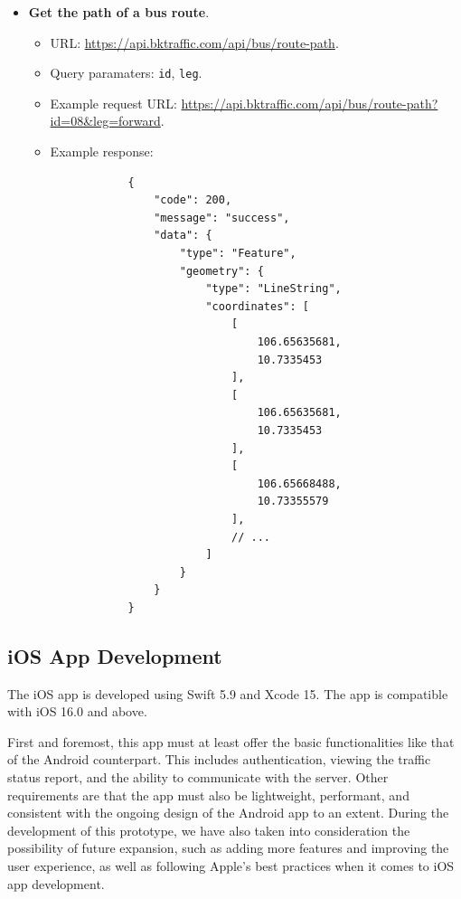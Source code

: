 \begin{itemize}
    \item \textbf{Get the path of a bus route}.
    \begin{itemize}
        \item URL: \url{https://api.bktraffic.com/api/bus/route-path}.
        \item Query paramaters: \lstinline{id}, \lstinline{leg}.
        \item Example request URL: \url{https://api.bktraffic.com/api/bus/route-path?id=08&leg=forward}.
        \item Example response:
        \begin{lstlisting}
            {
                "code": 200,
                "message": "success",
                "data": {
                    "type": "Feature",
                    "geometry": {
                        "type": "LineString",
                        "coordinates": [
                            [
                                106.65635681,
                                10.7335453
                            ],
                            [
                                106.65635681,
                                10.7335453
                            ],
                            [
                                106.65668488,
                                10.73355579
                            ],
                            // ...  
                        ]
                    }
                }
            }
        \end{lstlisting}
    \end{itemize} 
\end{itemize}


\subsection{iOS App Development}
The iOS app is developed using Swift 5.9 and Xcode 15. The app is compatible with iOS 16.0 and above.

First and foremost, this app must at least offer the basic functionalities like that of the Android counterpart. This includes authentication, viewing the traffic status report, and the ability to communicate with the server. Other requirements are that the app must also be lightweight, performant, and consistent with the ongoing design of the Android app to an extent. During the development of this prototype, we have also taken into consideration the possibility of future expansion, such as adding more features and improving the user experience, as well as following Apple's best practices when it comes to iOS app development.

